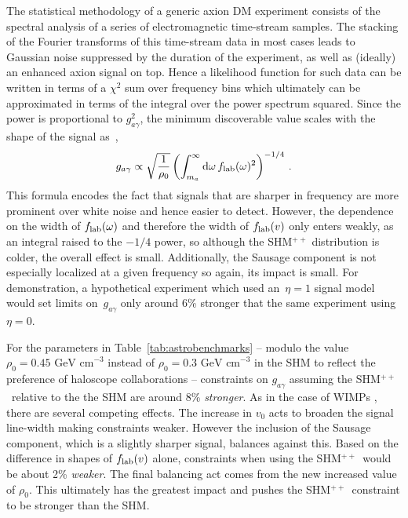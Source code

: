 \documentclass[prd,10pt,twocolumn,showpacs,nofootinbib, aps,superscriptaddress,preprintnumbers]{revtex4-1}
\newcommand{\GeVcm}{\textrm{ GeV cm}^{-3}}
\newcommand{\SHMpp}{SHM$^{++}$}
\begin{document}
The statistical methodology of a generic
axion DM experiment consists of the spectral analysis of a
series of electromagnetic time-stream samples. The stacking of the
Fourier transforms of this time-stream data in most cases leads to
Gaussian noise suppressed by the duration of the experiment, as well
as (ideally) an enhanced axion signal on top. Hence a
likelihood function for such data can be written in terms of a
$\chi^2$ sum over frequency bins which ultimately can be approximated
in terms of the integral over the power spectrum squared.  Since the
power is proportional to $g^2_{a\gamma}$, the minimum discoverable
value scales with the shape of the signal as~\cite{Foster:2017hbq},
%
 \begin{equation}
g_{a\gamma} \propto \sqrt{\frac{1}{\rho_0}} \left(\int_{m_a}^{\infty} \mathrm{d} \omega\, f_{\rm{lab}}(\omega)^2 \right)^{-1/4} \, .
 \end{equation}
%
This formula encodes the fact that signals that are sharper in frequency are more prominent over white noise and hence easier to detect. 
However, the dependence on the width of $f_{\rm{lab}}(\omega)$ and therefore the width of $f_{\rm{lab}}(v)$
only enters weakly, as an integral raised to the $-1/4$ power, so although the SHM$^{++}$ distribution is colder, the overall effect is small.
 Additionally, the Sausage component is not especially localized at a
given frequency so again, its impact is small.
For demonstration, a hypothetical experiment
which used an~$\eta = 1$ signal model would set limits on~$g_{a\gamma}$ 
only around 6\% stronger that the
same experiment using $\eta = 0$.

For the parameters in Table~\ref{tab:astrobenchmarks} -- modulo the value $\rho_0 =
0.45 \GeVcm$ instead of $\rho_0 =
0.3 \GeVcm$ in the SHM to reflect the preference of haloscope collaborations --
constraints on $g_{a\gamma}$ assuming the \SHMpp~relative to the the SHM are around 8\% \emph{stronger}. As in the case of WIMPs , there are several competing effects. 
The increase in $v_0$ acts to broaden the signal line-width making constraints weaker. 
However the inclusion of the Sausage component, which is a slightly sharper signal, balances against this. 
Based on the difference in shapes of $f_{\rm{lab}}(v)$ alone, constraints when using the \SHMpp~would be about 2\% \emph{weaker}. 
The final balancing act comes from the new increased value of $\rho_0$. This ultimately has the greatest impact and pushes the \SHMpp~constraint to be stronger than the SHM. 
\end{document}
